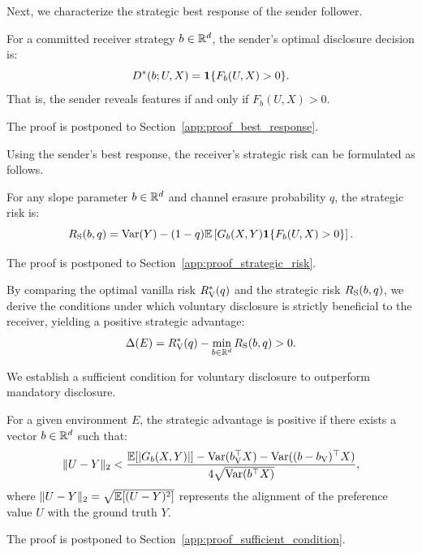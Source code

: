 Next, we characterize the strategic best response of the sender follower.
\begin{lemma}
\label{lem:best_response}
For a committed receiver strategy $b \in \mathbb{R}^d$, the sender's optimal disclosure decision is:
\begin{equation}
    \label{eq:best_response_indicator}
    D^*(b; U, X) = \mathbf{1}\{F_b(U, X) > 0\}.
\end{equation}
That is, the sender reveals features if and only if $F_b(U, X) > 0$.
\end{lemma}
The proof is postponed to Section~\ref{app:proof_best_response}.

Using the sender's best response, the receiver's strategic risk can be formulated as follows.
\begin{lemma}
\label{lem:strategic_risk_formula}
For any slope parameter $b \in \mathbb{R}^d$ and channel erasure probability $q$, the strategic risk is:
\begin{equation}
    \label{eq:strategic_risk_formula}
    R_{\mathrm{S}}(b, q) = \mathrm{Var}(Y) - (1 - q)\mathbb{E}\left[ G_b(X, Y) \mathbf{1}\{F_b(U, X) > 0\} \right].
\end{equation}
\end{lemma}
The proof is postponed to Section~\ref{app:proof_strategic_risk}.

By comparing the optimal vanilla risk $R_{\mathrm{V}}^*(q)$ and the strategic risk $R_{\mathrm{S}}(b, q)$, we derive the conditions under which voluntary disclosure is strictly beneficial to the receiver, yielding a positive strategic advantage:
\begin{equation}
    \label{eq:strategic_advantage_formula}
    \Delta(E) = R_{\mathrm{V}}^*(q) - \min_{b \in \mathbb{R}^d} R_{\mathrm{S}}(b, q) > 0.
\end{equation}

We establish a sufficient condition for voluntary disclosure to outperform mandatory disclosure.
\begin{theorem}
\label{thm:sufficient_condition}
For a given environment $E$, the strategic advantage is positive if there exists a vector $b \in \mathbb{R}^d$ such that:
\begin{equation}
    \label{eq:sufficient_condition}
    \|U - Y\|_2 < \frac{\mathbb{E}[|G_b(X, Y)|] - \mathrm{Var}(b_{\mathrm{V}}^\top X) - \mathrm{Var}((b - b_{\mathrm{V}})^\top X)}{4\sqrt{\mathrm{Var}(b^\top X)}},
\end{equation}
where $\|U - Y\|_2 = \sqrt{\mathbb{E}[(U - Y)^2]}$ represents the alignment of the preference value $U$ with the ground truth $Y$.
\end{theorem}
The proof is postponed to Section~\ref{app:proof_sufficient_condition}.

